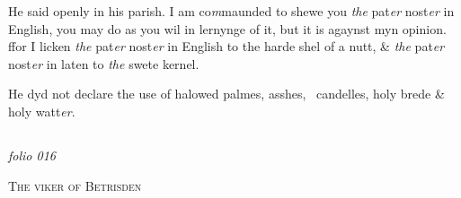 \documentclass[12pt, a4paper]{book}
\begin{document}
			
		\ifthenelse{\isodd{\thepage}}
		{\reversemarginpar}
		{\normalmarginpar}
		He said openly in his parish. I am co\textit{m}maunded to shewe you \textit{the} pat\textit{er} nost\textit{er} in English, you may do as you wil in lernynge of it, but it is agaynst myn opinion. ffor I licken \textit{the} pat\textit{er} nost\textit{er} in English to the harde shel of a nutt, \& \textit{the} pat\textit{er} nost\textit{er} in laten to \textit{the} swete kernel.
		
		
			
				\marginpar[\vspace{0.5cm}{\textcolor{Gray}{ceremonies}}]{}
			
			
		\ifthenelse{\isodd{\thepage}}
		{\reversemarginpar}
		{\normalmarginpar}
		He dyd not declare the use of halowed palmes, asshes, 
 candelles, holy brede \& holy watt\textit{er}.
		

	
            
\dotfill
					  \subsection*{}  \subsection*{}  \subsection*{}  \subsection*{}  \subsection*{}

\textit{folio 016}


            
            	
				\begin{center} \begin{large} {\scshape The viker of Betrisden} \end{large} \end{center}
			
\end{document}
